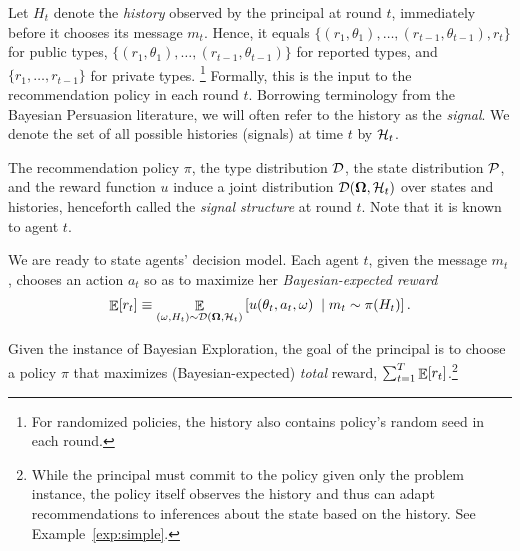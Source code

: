 

Let $H_t$ denote the \emph{history} observed by the principal at round $t$, immediately before it chooses its message $m_t$. Hence, it equals $\{(r_1,\theta_1),\ldots,(r_{t-1},\theta_{t-1}),r_t\}$ for public types, $\{(r_1,\theta_1),\ldots,(r_{t-1},\theta_{t-1})\}$ for reported types, and $\{r_1,\ldots,r_{t-1}\}$ for private types.%
\footnote{For randomized policies, the history also contains policy's random seed in each round.}
Formally, this is the input to the recommendation policy in each round $t$. Borrowing terminology from the Bayesian Persuasion literature, we will often refer to the history as the {\em signal}. We denote the set of all possible histories (signals) at time $t$ by $\mathcal{H}_t$.


The recommendation policy $\pi$, the type distribution $\mathcal{D}$, the state distribution $\mathcal{P}$, and the reward function $u$ induce a joint distribution $\mathcal{D}(\bold{\Omega},\mathcal{H}_t)$ over states and histories, henceforth called the {\em signal structure} at round $t$. Note that it is known to agent $t$.

We are ready to state agents' decision model. Each agent $t$, given the message $m_t$, chooses an action $a_t$ so as to maximize her {\em Bayesian-expected reward}
\begin{align}
 \mathop{\mathbb{E}}[r_t]\equiv
    \mathop{\mathbb{E}}_{(\omega,H_t)\sim\mathcal{D}(\bold{\Omega},\mathcal{H}_t)}
    \left[
        u(\theta_t,a_t,\omega)\; \mid m_t\sim\pi(H_t)
    \right].
\end{align}

Given the instance of Bayesian Exploration, the goal of the principal is to choose a policy $\pi$ that maximizes (Bayesian-expected) {\em total} reward, \ie $\sum_{t=1}^T \mathop{\mathbb{E}}[r_t]$.\footnote{While the principal must commit to the policy given only the problem instance, the policy itself observes the history and thus can adapt recommendations to inferences about the state based on the history.  See Example~\ref{exp:simple}.}

